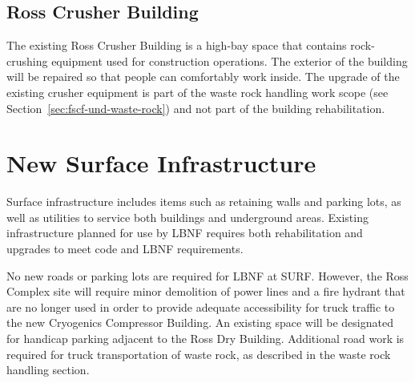 \subsection{Ross Crusher Building}
\label{sec:fscf-surf-facil-surface-bldg-rosscrusher}

The existing Ross Crusher Building is a high-bay space that contains rock-crushing equipment used for construction operations. The exterior of the building will be repaired 
so that people can comfortably work inside. %
The upgrade of the existing crusher equipment is part of the waste rock handling work scope (see Section~\ref{sec:fscf-und-waste-rock}) and not part of the building rehabilitation. 

\section{New Surface Infrastructure}
\label{sec:fscf-surf-facil-surface-new}

Surface infrastructure includes items such as retaining walls and parking lots, as well as utilities to service both buildings and underground areas.  Existing infrastructure planned for use by LBNF requires both rehabilitation and upgrades to meet code and LBNF requirements. 

No new roads or parking lots are required for LBNF at SURF. However, the Ross Complex site will require minor demolition of power lines and a fire hydrant that are no longer used in order to provide adequate accessibility for truck traffic to the new Cryogenics Compressor Building. An existing space will be designated for handicap parking adjacent to the Ross Dry Building. Additional road work is required for truck transportation of waste rock, as described in the waste rock handling section.




